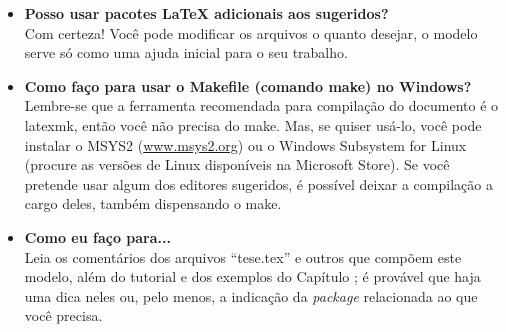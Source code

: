 \begin{itemize}
\item \textbf{Posso usar pacotes \LaTeX{} adicionais aos sugeridos?}\\
Com certeza! Você pode modificar os arquivos o quanto desejar, o modelo serve só como uma ajuda inicial para o seu trabalho.

\item \textbf{Como faço para usar o Makefile (comando make) no Windows?}\\
Lembre-se que a ferramenta recomendada para compilação do documento é o \textsf{latexmk}, então você não precisa do \textsf{make}. Mas, se quiser usá-lo, você pode instalar o MSYS2 (\url{www.msys2.org}) ou o Windows Subsystem for Linux (procure as versões de Linux disponíveis na Microsoft Store). Se você pretende usar algum dos editores sugeridos, é possível deixar a compilação a cargo deles, também dispensando o \textsf{make}.

\item \textbf{Como eu faço para...}\\
Leia os comentários dos arquivos ``tese.tex'' e outros que compõem este modelo, além do tutorial %
e dos exemplos do Capítulo %
; é provável que haja uma dica neles ou, pelo menos, a indicação da \textit{package} relacionada ao que você precisa.

\end{itemize}
